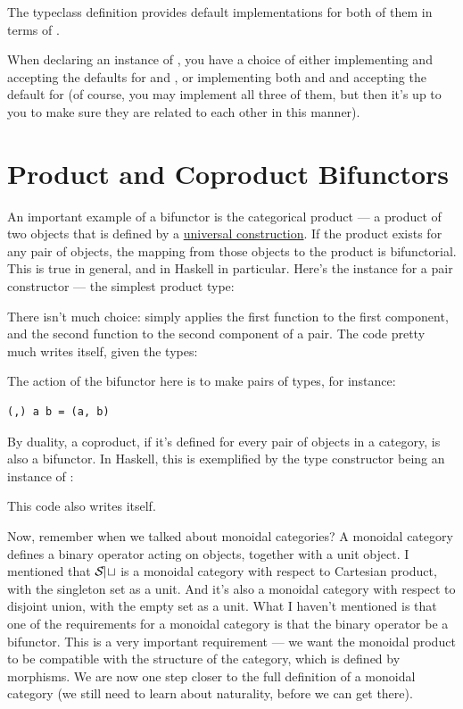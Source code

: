 \noindent
The typeclass definition provides default implementations for both of
them in terms of .

When declaring an instance of , you have a choice of
either implementing  and accepting the defaults for
 and , or implementing both 
and  and accepting the default for  (of
course, you may implement all three of them, but then it's up to you to
make sure they are related to each other in this manner).

\section{Product and Coproduct Bifunctors}

An important example of a bifunctor is the categorical product --- a
product of two objects that is defined by a \hyperref[products-and-coproducts]{universal
construction}. If the product exists for any pair of objects, the
mapping from those objects to the product is bifunctorial. This is true
in general, and in Haskell in particular. Here's the 
instance for a pair constructor --- the simplest product type:

There isn't much choice:  simply applies the first
function to the first component, and the second function to the second
component of a pair. The code pretty much writes itself, given the
types:

The action of the bifunctor here is to make pairs of types, for
instance:

\begin{Verbatim}
(,) a b = (a, b)
\end{Verbatim}
By duality, a coproduct, if it's defined for every pair of objects in a
category, is also a bifunctor. In Haskell, this is exemplified by the
 type constructor being an instance of
:

This code also writes itself.

Now, remember when we talked about monoidal categories? A mo\-noidal
category defines a binary operator acting on objects, together with a
unit object. I mentioned that $\mathcal{S\mkern-3mu et}$ is a monoidal category with
respect to Cartesian product, with the singleton set as a unit. And it's
also a monoidal category with respect to disjoint union, with the empty
set as a unit. What I haven't mentioned is that one of the requirements
for a monoidal category is that the binary operator be a bifunctor. This
is a very important requirement --- we want the monoidal product to be
compatible with the structure of the category, which is defined by
morphisms. We are now one step closer to the full definition of a
monoidal category (we still need to learn about naturality, before we
can get there).

